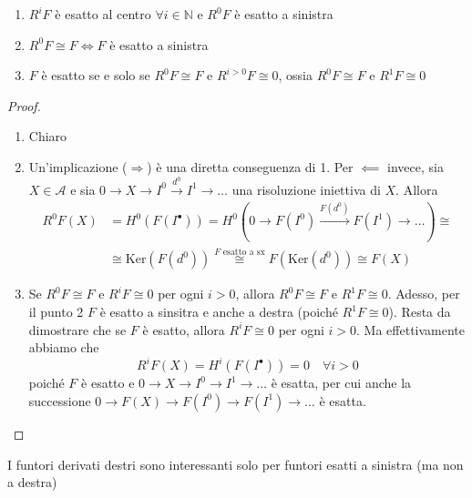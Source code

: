 \begin{corollary}{}\label{cor:R0F-F-esatto}
\begin{enumerate}[label = \arabic*.]
    \item \(R^{i}F\) è esatto al centro \(\forall i \in \mathbb{N}\) e \(R^{0}F\)
        è esatto a sinistra
    \item \(R^{0}F \cong F \iff F\) è esatto a sinistra 
    \item \(F\) è esatto se e solo se \(R^{0}F \cong F\) e \(R^{i > 0}F \cong 0\),
        ossia \(R^{0}F \cong F\) e \(R^{1}F \cong 0\) 
\end{enumerate}
\end{corollary}

\begin{proof}{}
\begin{enumerate}[label = \arabic*.]
    \item Chiaro
    \item Un'implicazione (\(\Rightarrow\)) è una diretta conseguenza di 1. Per
        \(\impliedby \) invece, sia \(X \in \mathcal{A}\) e sia \(0 \to X \to
        I^{0} \overset{d^{0}}{\to} I^{1} \to  \dots\) una risoluzione iniettiva
        di \(X\). Allora
        \begin{align*}
            R^{0}F{(X)} &= H^{0}{(F{(I^{\bullet})})} = H^{0}{(0 \to F{(I^{0})}
            \overset{F{(d^{0})}}{\to} F{(I^{1})} \to \dots)} \cong \\ &\cong
          \mathrm{Ker}{(F{(d^{0})})} \overset{\text{\(F\) esatto a sx}}{\cong}
          F{(\mathrm{Ker}{(d^{0})})} \cong F{(X)}
        \end{align*}
    \item Se \(R^{0}F \cong F\) e \(R^{i}F \cong 0\) per ogni \(i > 0\), allora
        \(R^{0}F \cong F\) e \(R^{1} F \cong 0\). Adesso, per il punto 2 \(F\) è
        esatto a sinsitra e anche a destra (poiché \(R^{1}F \cong 0\)). Resta da
        dimostrare che se \(F\) è esatto, allora \(R^{i}F \cong 0\) per ogni \(i
        > 0\). Ma effettivamente abbiamo che
        \[
          R^{i}F{(X)} = H^{i}{(F{(I^\bullet)})} = 0 \quad \forall i > 0
        \]
        poiché \(F\) è esatto e \(0 \to X \to I^{0} \to I^{1} \to \dots\) è
        esatta, per cui anche la successione \(0 \to F{(X)} \to F{(I^{0})} \to F{(I^{1})} \to
        \dots\) è esatta.
\end{enumerate}
\end{proof}
\begin{remark}{}
    I funtori derivati destri sono interessanti solo per funtori esatti a
    sinistra (ma non a destra)
\end{remark}



